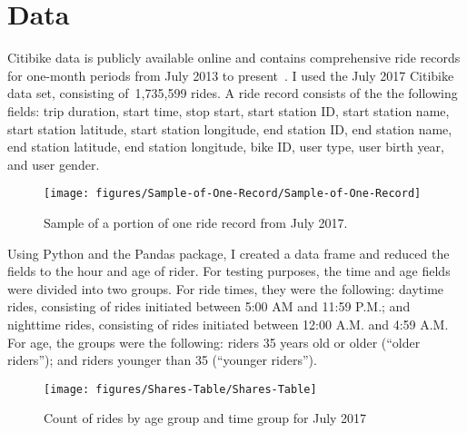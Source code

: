 \documentclass[10pt]{article}
\let\cite\citep
\providecommand\citep{\cite}
\begin{document}
\section*{Data}

{\label{507127}}

Citibike data is publicly available online and contains comprehensive
ride records for one-month periods from July 2013 to
present~\cite{nyc}. I used the July 2017 Citibike data set,
consisting of~1,735,599 rides. A ride record consists of the the
following fields: trip duration, start time, stop start, start station
ID, start station name, start station latitude, start station longitude,
end station ID, end station name, end station latitude, end station
longitude, bike ID, user type, user birth year, and user gender.
\begin{figure}[h!]
\begin{center}
\texttt{[image: figures/Sample-of-One-Record/Sample-of-One-Record]}
\caption{{Sample of a portion of one ride record from July 2017.
{\label{886700}}%
}}
\end{center}
\end{figure}

Using Python and the Pandas package, I created a data frame and reduced
the fields to the hour and age of rider. For testing purposes, the time
and age fields were divided into two groups. For ride times, they were
the following: daytime rides, consisting of rides initiated between 5:00
AM and 11:59 P.M.; and nighttime rides, consisting of rides initiated
between 12:00 A.M. and 4:59 A.M. For age, the groups were the following:
riders 35 years old or older (``older riders''); and riders younger than
35 (``younger riders'').
\begin{figure}[h!]
\begin{center}
\texttt{[image: figures/Shares-Table/Shares-Table]}
\caption{{Count of rides by age group and time group for July 2017
{\label{118105}}%
}}
\end{center}
\end{figure}
\end{document}
